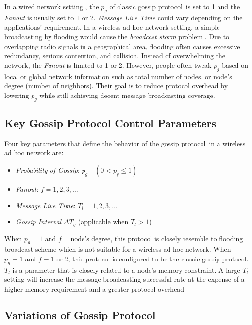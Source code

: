 \documentclass[onehalf,11pt]{beavtex}
\newcommand{\gp}{gossip protocol}
\newcommand{\pog}{Probability of Gossip}
\begin{document}
In a wired network setting , the $p_g$ of classic \gp ~is set to 1 and the \emph{Fanout} is usually set to 1 or 2. \emph{Message Live Time} could vary depending on the applications' requirement. In a wireless ad-hoc network setting, a simple broadcasting by flooding would cause the \emph{broadcast storm} problem \cite{tseng2002broadcast}. Due to overlapping radio signals in a geographical area, flooding often causes excessive redundancy, serious contention, and collision. Instead of overwhelming the network, the \emph{Fanout} is limited to 1 or 2. However, people often tweak $p_g$ based on local or global network information such as total number of nodes, or node's degree (number of neighbors). Their goal is to reduce protocol overhead by lowering $p_g$ while still achieving decent message broadcasting coverage. 


\subsection{Key Gossip Protocol Control Parameters}
Four key parameters that define the behavior of the \gp ~in a wireless ad hoc network are: 

\begin{itemize}
	\item \emph{\pog}: $p_g  \quad (0 < p_g \leq 1)$
	\item \emph{Fanout}: $f = 1, 2, 3, \ldots$
	\item \emph{Message Live Time}: $T_l = 1,2,3, \ldots$
	\item \emph{Gossip Interval} $\Delta T_g$ (applicable when $T_l > 1$)
\end{itemize}

When $p_g = 1$ and $f = \mbox{node's degree}$, this protocol is closely resemble to flooding broadcast scheme which is not suitable for a wireless ad-hoc network. When $p_g = 1$ and $f = 1 \mbox{ or } 2$, this protocol is configured to be the classic \gp. $T_l$ is a parameter that is closely related to a node's memory constraint. A large $T_l$ setting will increase the message broadcasting successful rate at the expense of a higher memory requirement and a greater protocol overhead. 

\subsection{Variations of Gossip Protocol}
\end{document}
